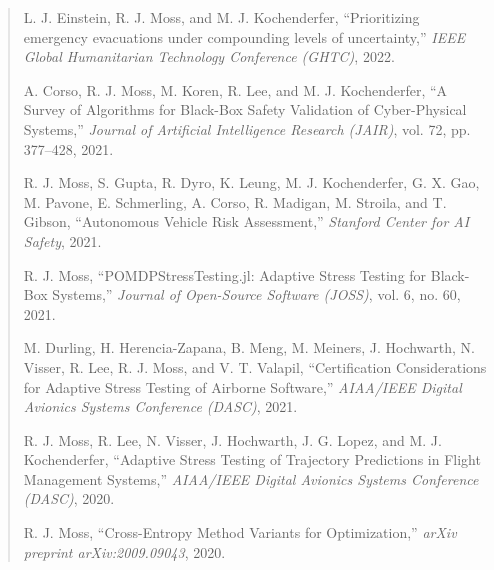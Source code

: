 \begin{quote}
    \phantom{---}

    L. J. Einstein, R. J. Moss, and M. J. Kochenderfer, ``Prioritizing emergency evacuations under compounding levels of uncertainty,'' \textit{IEEE Global Humanitarian Technology Conference (GHTC)}, 2022.\\

    \phantom{---}

    \cite{corso2021survey} A. Corso, R. J. Moss, M. Koren, R. Lee, and M. J. Kochenderfer, ``A Survey of Algorithms for Black-Box Safety Validation of Cyber-Physical Systems,'' \textit{Journal of Artificial Intelligence Research (JAIR)}, vol. 72, pp. 377--428, 2021.\\

    \phantom{---}

    R. J. Moss, S. Gupta, R. Dyro, K. Leung, M. J. Kochenderfer, G. X. Gao, M. Pavone, E. Schmerling, A. Corso, R. Madigan, M. Stroila, and T. Gibson, ``Autonomous Vehicle Risk Assessment,'' \textit{Stanford Center for AI Safety}, 2021.\\

    \phantom{---}

    R. J. Moss, ``POMDPStressTesting.jl: Adaptive Stress Testing for Black-Box Systems,'' \textit{Journal of Open-Source Software (JOSS)}, vol. 6, no. 60, 2021.\\

    \phantom{---}

    M. Durling, H. Herencia-Zapana, B. Meng, M. Meiners, J. Hochwarth, N. Visser, R. Lee, R. J. Moss, and V. T. Valapil, ``Certification Considerations for Adaptive Stress Testing of Airborne Software,'' \textit{AIAA/IEEE Digital Avionics Systems Conference (DASC)}, 2021.\\

    \phantom{---}

    R. J. Moss, R. Lee, N. Visser, J. Hochwarth, J. G. Lopez, and M. J. Kochenderfer, ``Adaptive Stress Testing of Trajectory Predictions in Flight Management Systems,'' \textit{AIAA/IEEE Digital Avionics Systems Conference (DASC)}, 2020.\\

    \phantom{---}

    \cite{moss2020crossentropy} R. J. Moss, ``Cross-Entropy Method Variants for Optimization,'' \textit{arXiv preprint arXiv:2009.09043}, 2020.\\
\end{quote}


